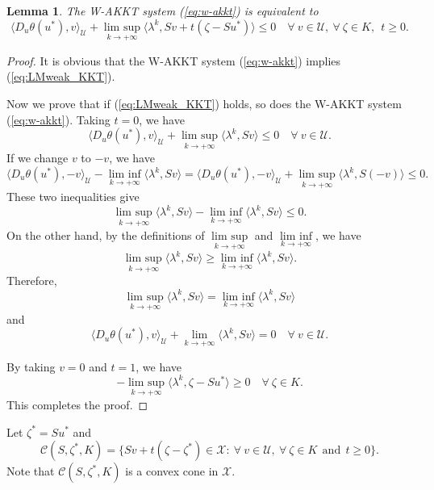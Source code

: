 \documentclass[leqno]{amsart}
\DeclareMathOperator*\lowlim{lim\ inf}
\DeclareMathOperator*\uplim{lim\ sup}
\newtheorem{lemma}[theorem]{Lemma}
\theoremstyle{definition}
\begin{document}
\begin{lemma}\label{lem:wakkt-eq}
The W-AKKT system (\ref{eq:w-akkt}) is equivalent to
\begin{equation}\label{eq:LMweak_KKT}
\langle D_u\theta(u^*), v\rangle_\mathcal{U}  + \uplim\limits_{k\rightarrow +\infty}\langle \lambda^{k}, Sv + t(\zeta - Su^*)\rangle \leq 0\quad \forall\ v\in \mathcal{U},\ \forall\ \zeta\in K,\ \ t\geq 0.
\end{equation}
\end{lemma}
\begin{proof}
It is obvious that the W-AKKT system (\ref{eq:w-akkt}) implies (\ref{eq:LMweak_KKT}). 

Now we prove that if (\ref{eq:LMweak_KKT}) holds, so does the W-AKKT system (\ref{eq:w-akkt}).
Taking $t=0$, we have
$$ \langle D_u\theta(u^*), v\rangle_\mathcal{U} + \uplim\limits_{k\rightarrow +\infty}\langle \lambda^{k}, Sv \rangle \leq 0\quad \forall\ v\in \mathcal{U}.$$
If we change $v$ to $-v$, we have
$$ \langle D_u\theta(u^*), -v\rangle_\mathcal{U} - \lowlim\limits_{k\rightarrow +\infty}\langle \lambda^{k}, Sv \rangle = \langle D_u\theta(u^*), -v\rangle_\mathcal{U} + \uplim\limits_{k\rightarrow +\infty}\langle \lambda^{k}, S(-v) \rangle \leq 0.$$
These two inequalities give
$$ \uplim\limits_{k\rightarrow +\infty}\langle \lambda^{k}, Sv\rangle -  \lowlim\limits_{k\rightarrow +\infty}\langle \lambda^{k}, Sv \rangle \leq 0.$$
On the other hand, by the definitions of $\uplim\limits_{k\rightarrow +\infty}$ and $\lowlim\limits_{k\rightarrow +\infty}$, we have
$$ \uplim\limits_{k\rightarrow +\infty}\langle \lambda^{k}, Sv\rangle \geq  \lowlim\limits_{k\rightarrow +\infty}\langle \lambda^{k}, Sv \rangle.$$
Therefore,
$$ \uplim\limits_{k\rightarrow +\infty}\langle \lambda^{k}, Sv\rangle = \lowlim\limits_{k\rightarrow +\infty}\langle \lambda^{k}, Sv \rangle$$
and
$$\langle D_u\theta(u^*), v\rangle_\mathcal{U} + \lim\limits_{k\rightarrow +\infty}\langle \lambda^{k}, Sv \rangle = 0\quad \forall\ v\in \mathcal{U}.$$

By taking $v = 0$ and $t=1$, we have
$$-\uplim\limits_{k\rightarrow +\infty}\langle \lambda^{k}, \zeta - Su^*\rangle \geq 0\quad \forall\ \zeta\in K.$$
This completes the proof.
\end{proof}

Let $\zeta^* = Su^*$ and 
$$ \mathcal{C}(S, \zeta^*, K) = \{Sv + t(\zeta - \zeta^*)\in \mathcal{X}:\ \forall\ v\in \mathcal{U},\ \forall\ \zeta\in K\ \ \mbox{and}\ \ t\geq 0\}.$$
Note that $\mathcal{C}(S, \zeta^*, K)$ is a convex cone in $\mathcal{X}$.
\end{document}
